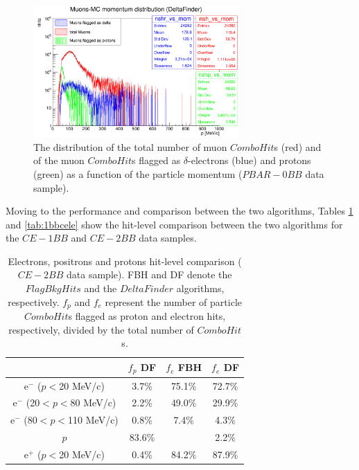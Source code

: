  \begin{figure}[!h]
            \centering
            \includegraphics[width =0.7\textwidth]{figures/png/Screenshot_20240805_222923.png}
        \caption[The  
        distribution of the total 
        and flagged number of muon 
        $ComboHit$s as a function of the particle momentum.]{The  
        distribution of the total number of 
        muon $ComboHit$s 
        (red) and of the muon $ComboHit$s 
        flagged as $\delta$-electrons (blue) 
        and protons (green) as a function of the particle momentum ($PBAR-0BB$ data sample). }
           \label{fig:0pbarbefore}
\end{figure}

Moving to the performance and comparison 
between the two algorithms, Tables \ref{tab:2bbcele} and \ref{tab:1bbcele} 
show the hit-level comparison between the two algorithms 
for the $CE-1BB$ and $CE-2BB$ data samples.
\begin{center}
    \begin{table}[h!]
    \centering
    \renewcommand{\arraystretch}{1.}
    \begin{tabular}{| c | c | c | c |} 
    \hline
    &    $f_{p}$ DF & $f_{e}$ FBH  & $f_{e}$ DF \\
    \hline
    e$^-$ ($p<$20 MeV/c)      & 3.7\%   & 75.1\% & 72.7\%\\
    \hline
    e$^-$ (20$<p<$80 MeV/c)  & 2.2\%   & 49.0\%& 29.9\%\\
    \hline
    e$^-$ (80$<p<$110 MeV/c)  & 0.8\%  &  7.4\%& 4.3\%\\
    \hline
    $p$       &  83.6\%  &  & 2.2\%\\
    \hline
    e$^+$ ($p<$20 MeV/c) & 0.4\%    &   84.2\%& 87.9\%\\
    \hline
    \end{tabular}
    \caption{Electrons, 
    positrons and protons hit-level 
    comparison ($CE-2BB$ data sample). 
    FBH and DF denote  
    the $FlagBkgHits$ and the 
    $DeltaFinder$ algorithms, 
    respectively. $f_p$ and $f_e$ represent 
    the number of particle $ComboHit$s 
    flagged as proton and electron hits, respectively, 
    divided by the total number of $ComboHit$s.
    }\label{tab:2bbcele}
    \end{table}
    \end{center}

